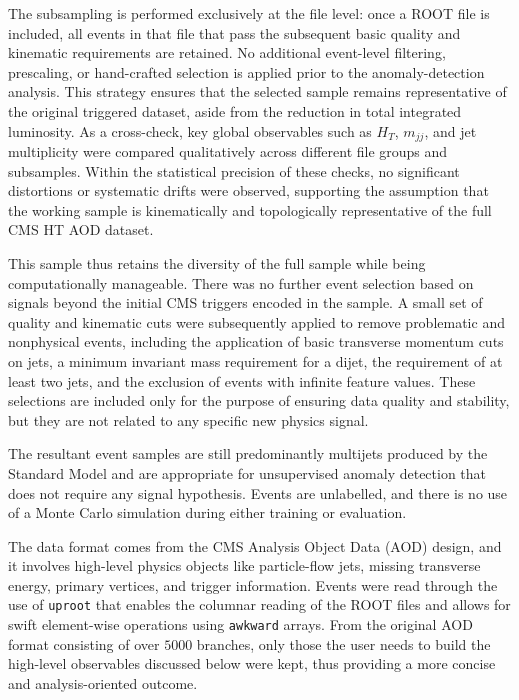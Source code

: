 \documentclass[11pt]{article}
\begin{document}
The subsampling is performed exclusively at the file level: once a ROOT file is included, all events in that file that pass the subsequent basic quality and kinematic requirements are retained. No additional event-level filtering, prescaling, or hand-crafted selection is applied prior to the anomaly-detection analysis. This strategy ensures that the selected sample remains representative of the original triggered dataset, aside from the reduction in total integrated luminosity. As a cross-check, key global observables such as $H_T$, $m_{jj}$, and jet multiplicity were compared qualitatively across different file groups and subsamples. Within the statistical precision of these checks, no significant distortions or systematic drifts were observed, supporting the assumption that the working sample is kinematically and topologically representative of the full CMS HT AOD dataset.

This sample thus retains the diversity of the full sample while being computationally manageable. There was no further event selection based on signals beyond the initial CMS triggers encoded in the sample. A small set of quality and kinematic cuts were subsequently applied to remove problematic and nonphysical events, including the application of basic transverse momentum cuts on jets, a minimum invariant mass requirement for a dijet, the requirement of at least two jets, and the exclusion of events with infinite feature values. These selections are included only for the purpose of ensuring data quality and stability, but they are not related to any specific new physics signal.

The resultant event samples are still predominantly multijets produced by the Standard Model and are appropriate for unsupervised anomaly detection that does not require any signal hypothesis. Events are unlabelled, and there is no use of a Monte Carlo simulation during either training or evaluation.

The data format comes from the CMS Analysis Object Data (AOD) design, and it involves high-level physics objects like particle-flow jets, missing transverse energy, primary vertices, and trigger information. Events were read through the use of \texttt{uproot} that enables the columnar reading of the ROOT files and allows for swift element-wise operations using \texttt{awkward} arrays. From the original AOD format consisting of over $5000$ branches, only those the user needs to build the high-level observables discussed below were kept, thus providing a more concise and analysis-oriented outcome.
\end{document}

